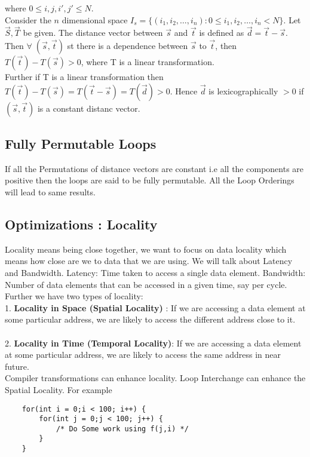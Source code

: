 \documentclass{article}
\begin{document}
where $0 \leq i,j,i',j' \leq N$. \\ 

Consider the $n$ dimensional space $I_s = \{(i_1,i_2,\ldots,i_n) : 0 \leq i_1,i_2,\ldots,i_n < N\}$. Let $\vec{S}, \vec{T}$ be given. The distance vector between $\vec{s}$ and $\vec{t}$ is defined as $\vec{d} = \vec{t} - \vec{s}$. Then $\forall \; (\vec{s}, \vec{t})$ st there is a dependence between $\vec{s}$ to $\vec{t}$, then $T(\vec{t}) - T(\vec{s}) > 0$, where T is a linear transformation. \\

Further if T is a linear transformation then $T(\vec{t}) - T(\vec{s}) = T(\vec{t} - \vec{s}) = T(\vec{d}) > 0$. Hence $\vec{d}$ is lexicographically $> 0$ if $(\vec{s},\vec{t})$ is a constant distanc vector.

\subsection*{Fully Permutable Loops}
If all the Permutations of distance vectors are constant i.e all the components are positive then the loops are said to be fully permutable. All the Loop Orderings will lead to same results.

\subsection*{Optimizations : Locality}
Locality means being close together, we want to focus on data locality which means how close are we to data that we are using. We will talk about Latency and Bandwidth. Latency: Time taken to access a single data element. Bandwidth: Number of data elements that can be accessed in a given time, say per cycle. \\

Further we have two types of locality: \\
1. \textbf{Locality in Space (Spatial Locality)} : If we are accessing a data element at some particular address, we are likely to access the different address close to it. \\ \\
2. \textbf{Locality in Time (Temporal Locality)}: If we are accessing a data element at some particular address, we are likely to access the same address in near future. \\

Compiler transformations can enhance locality. Loop Interchange can enhance the Spatial Locality. For example
\begin{lstlisting}
    for(int i = 0;i < 100; i++) {
        for(int j = 0;j < 100; j++) {
            /* Do Some work using f(j,i) */
        }
    }
\end{lstlisting}
\end{document}
